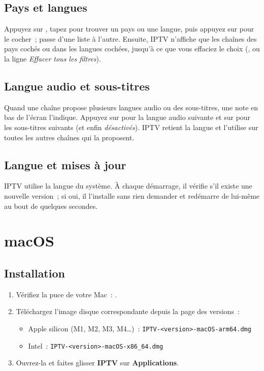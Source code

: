 \subsection{Pays et langues}
Appuyez sur , tapez pour trouver un pays ou une langue, puis appuyez
sur  pour le cocher~;  passe d'une liste à l'autre.
Ensuite, IPTV n'affiche que les chaînes des pays cochés ou dans les langues
cochées, jusqu'à ce que vous effaciez le choix (, ou la ligne
\emph{Effacer tous les filtres}).

\subsection{Langue audio et sous-titres}
Quand une chaîne propose plusieurs langues audio ou des sous-titres, une note
en bas de l'écran l'indique. Appuyez sur  pour la langue audio
suivante et sur  pour les sous-titres suivants (et enfin
\emph{désactivés}). IPTV retient la langue et l'utilise sur toutes les autres
chaînes qui la proposent.

\subsection{Langue et mises à jour}
IPTV utilise la langue du système. À chaque démarrage, il vérifie s'il existe
une nouvelle version~; si oui, il l'installe sans rien demander et redémarre
de lui-même au bout de quelques secondes.

\section{macOS}

\subsection{Installation}
\begin{enumerate}
  \item Vérifiez la puce de votre Mac~: .
  \item Téléchargez l'image disque correspondante depuis la page des
        versions~:
  \begin{itemize}
    \item Apple silicon (M1, M2, M3, M4\ldots)~:
          \texttt{IPTV-\textless version\textgreater-macOS-arm64.dmg}
    \item Intel~: \texttt{IPTV-\textless version\textgreater-macOS-x86\_64.dmg}
  \end{itemize}
  \item Ouvrez-la et faites glisser \textbf{IPTV} sur \textbf{Applications}.
\end{enumerate}

